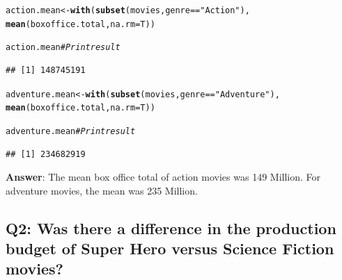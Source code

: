 \documentclass{tufte-book}\usepackage[]{graphicx}\usepackage[]{color}
\makeatletter
\newcommand{\hlstr}[1]{\textcolor[rgb]{0.192,0.494,0.8}{#1}}%
\newcommand{\hlcom}[1]{\textcolor[rgb]{0.678,0.584,0.686}{\textit{#1}}}%
\newcommand{\hlopt}[1]{\textcolor[rgb]{0,0,0}{#1}}%
\newcommand{\hlstd}[1]{\textcolor[rgb]{0.345,0.345,0.345}{#1}}%
\newcommand{\hlkwb}[1]{\textcolor[rgb]{0.69,0.353,0.396}{#1}}%
\newcommand{\hlkwc}[1]{\textcolor[rgb]{0.333,0.667,0.333}{#1}}%
\newcommand{\hlkwd}[1]{\textcolor[rgb]{0.737,0.353,0.396}{\textbf{#1}}}%
\newenvironment{kframe}{%
 \def\at@end@of@kframe{}%
 \ifinner\ifhmode%
  \def\at@end@of@kframe{\end{minipage}}%
  \begin{minipage}{\columnwidth}%
 \fi\fi%
 \def\FrameCommand##1{\hskip\@totalleftmargin \hskip-\fboxsep
 \colorbox{shadecolor}{##1}\hskip-\fboxsep
     \hskip-\linewidth \hskip-\@totalleftmargin \hskip\columnwidth}%
 \MakeFramed {\advance\hsize-\width
   \@totalleftmargin\z@ \linewidth\hsize
   \@setminipage}}%
 {\par\unskip\endMakeFramed%
 \at@end@of@kframe}
\newenvironment{knitrout}{}{} %
\makeatother
\begin{document}
\begin{knitrout}
\color{fgcolor}\begin{kframe}
\begin{alltt}
\hlstd{action.mean} \hlkwb{<-} \hlkwd{with}\hlstd{(}\hlkwd{subset}\hlstd{(movies, genre} \hlopt{==} \hlstr{"Action"}\hlstd{),}
                    \hlkwd{mean}\hlstd{(boxoffice.total,} \hlkwc{na.rm} \hlstd{= T))}

\hlstd{action.mean} \hlcom{# Print result}
\end{alltt}
\begin{verbatim}
## [1] 148745191
\end{verbatim}
\begin{alltt}
\hlstd{adventure.mean} \hlkwb{<-} \hlkwd{with}\hlstd{(}\hlkwd{subset}\hlstd{(movies, genre} \hlopt{==} \hlstr{"Adventure"}\hlstd{),}
                    \hlkwd{mean}\hlstd{(boxoffice.total,} \hlkwc{na.rm} \hlstd{= T))}

\hlstd{adventure.mean} \hlcom{# Print result}
\end{alltt}
\begin{verbatim}
## [1] 234682919
\end{verbatim}
\end{kframe}
\end{knitrout}

\textbf{Answer}: The mean box office total of action movies was 149 Million. For adventure movies, the mean was  235 Million.


\subsection{Q2: Was there a difference in the production budget of Super Hero versus Science Fiction movies?}
\end{document}
